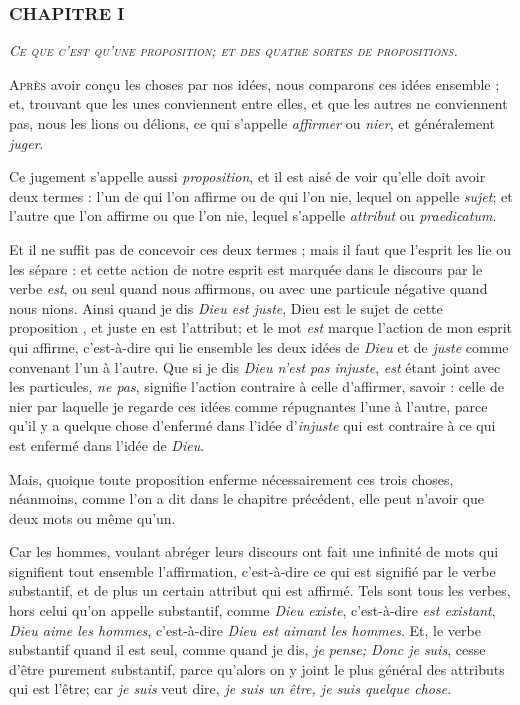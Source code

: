 \subsubsection{\centering \Large CHAPITRE I}
\begin{center}\emph{\large\scshape Ce que c'est qu'une proposition; et des quatre sortes de propositions.}\end{center}

	\lettrine{A}{près} avoir conçu les choses par nos idées, nous comparons ces idées ensemble ; et, trouvant que les unes conviennent entre elles, et que les autres ne conviennent pas, nous les lions ou délions, ce qui s'appelle \emph{affirmer} ou \emph{nier}, et généralement \emph{juger}.

Ce jugement s'appelle aussi \emph{proposition}, et il est aisé de voir qu'elle doit avoir deux termes : l'un de qui l'on affirme ou de qui l'on nie, lequel on appelle \emph{sujet}; et l'autre que l'on affirme ou que l'on nie, lequel s'appelle \emph{attribut} ou \emph{praedicatum}.

Et il ne suffit pas de concevoir ces deux termes ; mais il faut que l'esprit les lie ou les sépare : et cette action de notre esprit est marquée dans le discours par le verbe \emph{est}, ou seul quand nous affirmons, ou avec une particule négative quand nous nions. Ainsi quand je dis \emph{Dieu est juste}, Dieu est le sujet de cette proposition , et juste en est l'attribut; et le mot \emph{est} marque l'action de mon esprit qui affirme, c'est-à-dire qui lie ensemble les deux idées de \emph{Dieu} et de \emph{juste} comme convenant l'un à l'autre. Que si je dis \emph{Dieu n'est pas injuste}, \emph{est} étant joint avec les particules, \emph{ne pas}, signifie l'action contraire à celle d'affirmer, savoir : celle de nier par laquelle je regarde ces idées comme répugnantes l'une à l'autre, parce qu'il y a quelque chose d'enfermé dans l'idée d'\emph{injuste} qui est contraire à ce qui est enfermé dans l'idée de \emph{Dieu}.

Mais, quoique toute proposition enferme nécessairement ces trois choses, néanmoins, comme l'on a dit dans le chapitre précédent, elle peut n'avoir que deux mots ou même qu'un.

Car les hommes, voulant abréger leurs discours ont fait une infinité de mots qui signifient tout ensemble l'affirmation, c'est-à-dire ce qui est signifié par le verbe substantif, et de plus un certain attribut qui est affirmé. Tels sont tous les verbes, hors celui qu'on appelle substantif, comme \emph{Dieu existe}, c'est-à-dire \emph{est existant}, \emph{Dieu aime les hommes}, c'est-à-dire \emph{Dieu est aimant les hommes}. Et, le verbe substantif quand il est seul, comme quand je dis, \emph{je pense; Donc je suis}, cesse d'être purement substantif, parce qu'alors on y joint le plus général des attributs qui est l'être; car \emph{je suis} veut dire, \emph{je suis un être, je suis quelque chose}.

